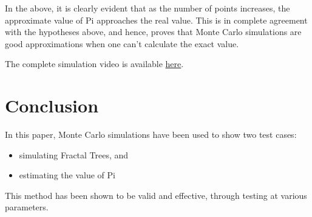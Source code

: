 \documentclass{resonance}
\begin{document}
\pagebreak

\begin{figure}
    \hskip-3.5cm
    \vspace{20pt}
    \fbox{\texttt{[image: pi\_ss\_1]}}
    \fbox{\texttt{[image: pi\_ss\_2]}}
    \fbox{\texttt{[image: pi\_ss\_3]}}
\end{figure}

In the above, it is clearly evident that as the number of points increases, the approximate value of Pi approaches the real value. This is in complete agreement with the hypotheses above, and hence, proves that Monte Carlo simulations are good approximations when one can’t calculate the exact value.


The complete simulation video is available \textcolor{blue}{\href{https://bit.ly/pi_approximation}{here}}.

\section{Conclusion}
In this paper, Monte Carlo simulations have been used to show two test cases:
\begin{itemize}
\item simulating Fractal Trees, and
\item estimating the value of Pi
\end{itemize}

This method has been shown to be valid and effective, through testing at various parameters.
\end{document}
